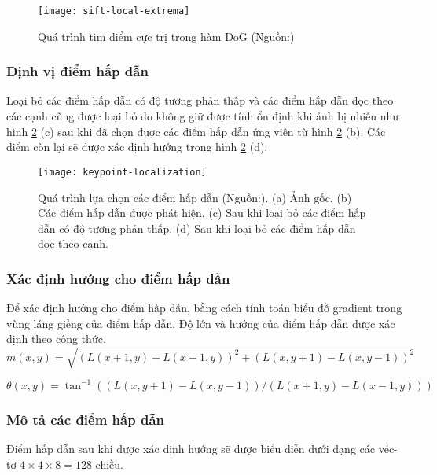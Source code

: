 \begin{figure}[h]
	\centering
	\texttt{[image: sift-local-extrema]}
	\caption[Quá trình tìm điểm cực trị trong hàm DoG]{Quá trình tìm điểm cực trị trong hàm DoG (Nguồn:\cite{lowe2004distinctive})}
	\label{fig:sle}
\end{figure}

\subsubsection{Định vị điểm hấp dẫn}
Loại bỏ các điểm hấp dẫn có độ tương phản thấp và các điểm hấp dẫn dọc theo các cạnh cũng được loại bỏ do không giữ được tính ổn định khi ảnh bị nhiễu như hình \ref{fig:kl} (c) sau khi đã chọn được các điểm hấp dẫn ứng viên từ hình \ref{fig:kl} (b). Các điểm còn lại sẽ được xác định hướng trong hình \ref{fig:kl} (d).\par

\begin{figure}[h]
	\centering
	\texttt{[image: keypoint-localization]}
	\caption[Quá trình lựa chọn các điểm hấp dẫn]{Quá trình lựa chọn các điểm hấp dẫn (Nguồn:\cite{lowe2004distinctive}). (a) Ảnh gốc. (b) Các điểm hấp dẫn được phát hiện. (c) Sau khi loại bỏ các điểm hấp dẫn có độ tương phản thấp. (d) Sau khi loại bỏ các điểm hấp dẫn dọc theo cạnh.}
	\label{fig:kl}
\end{figure}
	
\subsubsection{Xác định hướng cho điểm hấp dẫn}
	Để xác định hướng cho điểm hấp dẫn, bằng cách tính toán biểu đồ gradient trong vùng láng giềng của điểm hấp dẫn. Độ lớn và hướng của điểm hấp dẫn được xác định theo công thức.
\begin{equation}
m(x,y) = \sqrt{(L(x+1,y) - L(x-1, y))^2 + (L(x, y+1) - L(x, y-1))^2}
\end{equation}
	
\begin{equation}
\theta(x,y) = \tan^{-1}((L(x, y+1) - L(x,y-1)) / (L(x+1, y) - L(x-1, y)))
\end{equation}	
	
\subsubsection{Mô tả các điểm hấp dẫn}
Điểm hấp dẫn sau khi được xác định hướng sẽ được biểu diễn dưới dạng các véc-tơ $4 \times 4 \times 8=128$ chiều.


